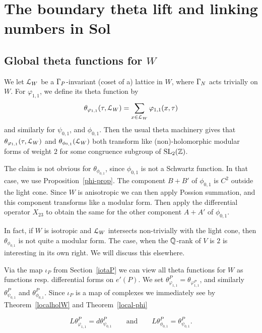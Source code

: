 

\section{The boundary theta lift and linking numbers in Sol}

\subsection{Global theta functions for $W$}

We let $\mathcal{L}_W$ be a $\Gamma_P$-invariant (coset of a) lattice in $W$, where $\Gamma_N$ acts trivially on $W$. For $\varphi_{1,1}$, we define its theta function by 
\[
\theta_{\varphi_{1,1}}(\tau,{\mathcal{L}_W})= \sum_{x \in \mathcal{L}_W} \varphi_{1,1}(x,\tau)
\]
and similarly for $\psi_{0,1}$, and $\phi_{0,1}$. Then the usual theta machinery gives that
$\theta_{\varphi_{1,1}}(\tau,{\mathcal{L}_W})$ and $\theta_{\phi_{0,1}}(\mathcal{L}_W)$ both transform like (non)-holomorphic modular forms of weight $2$ for some congruence subgroup of $\operatorname{SL}_2(\mathbb{Z})$. 

\begin{remark}
The claim is not obvious for $\theta_{\phi_{0,1}}$, since $\phi_{0,1}$ is not a Schwartz function. In that case, we use Proposition~\ref{phi-prop}. The component $B+B'$ of $\phi_{0,1}$ is $C^2$ outside the light cone. Since $W$ is anisotropic we can then apply Possion summation, and this component transforms like a modular form. Then apply the differential operator $X_{23}$ to obtain the same for the other component $A+A'$ of $\phi_{0,1}$. 
 
 In fact, if $W$ is isotropic and $\mathcal{L}_W$ intersects non-trivially with the light cone, then $\theta_{\phi_{0,1}}$ is not quite a modular form. The case, when the $\mathbb{Q}$-rank of $V$ is $2$ is interesting in its own right. We will discuss this elsewhere. 
\end{remark}






Via the map $\iota_P$ from Section~\ref{iotaP} we can view all theta functions for $W$ as functions resp. differential forms on $e'(P)$. We set $
\theta^P_{\varphi_{1,1}} =   \theta_{\varphi_{1,1}^P}$, 
and similarly $\theta^P_{\psi_{0,1}}$ and $\theta^P_{\phi_{0,1}}$. Since $\iota_P$ is a map of complexes we immediately see by Theorem~\ref{localholW} and Theorem~\ref{local-phi}

\begin{proposition}\label{globalholomorphic2}
\[
L \theta^P_{\varphi_{1,1}} = d\theta^P_{\psi_{0,1}} \qquad \text{and} \qquad 
L \theta^P_{\phi_{0,1}} = \theta^P_{\psi_{0,1}}.
\]
\end{proposition}


